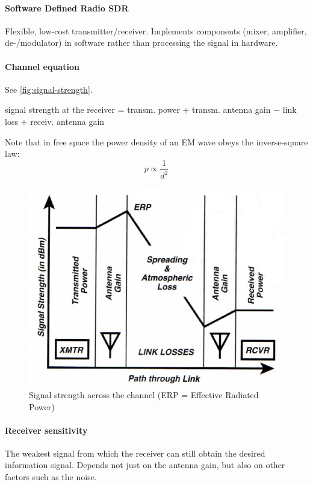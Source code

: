 \paragraph{Software Defined Radio SDR}
Flexible, low-cost transmitter/receiver.
Implements components (mixer, amplifier, de-/modulator) in software rather than processing the signal in hardware.

\paragraph{Channel equation}
See \autoref{fig:signal-strength}.

signal strength at the receiver = transm. power + transm. antenna gain $-$ link loss + receiv. antenna gain

Note that in free space the power density of an EM wave obeys the inverse-square law:
$$ p \propto \frac{1}{d^2} $$

\begin{figure}
	\centering
	\includegraphics[scale=0.4]{images/1-signal-strength.png}
	\caption{Signal strength across the channel (ERP = Effective Radiated Power)}
	\label{fig:signal-strength}
\end{figure}

\paragraph{Receiver sensitivity}
The weakest signal from which the receiver can still obtain the desired information signal.
Depends not just on the antenna gain, but also on other factors such as the noise.

